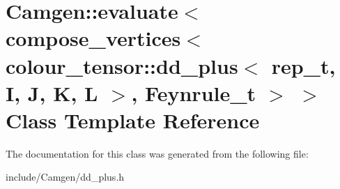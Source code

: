 \hypertarget{a00169}{}\section{Camgen\+:\+:evaluate$<$ compose\+\_\+vertices$<$ colour\+\_\+tensor\+:\+:dd\+\_\+plus$<$ rep\+\_\+t, I, J, K, L $>$, Feynrule\+\_\+t $>$ $>$ Class Template Reference}
\label{a00169}


The documentation for this class was generated from the following file\+:\begin{DoxyCompactItemize}
\item 
include/\+Camgen/dd\+\_\+plus.\+h\end{DoxyCompactItemize}
